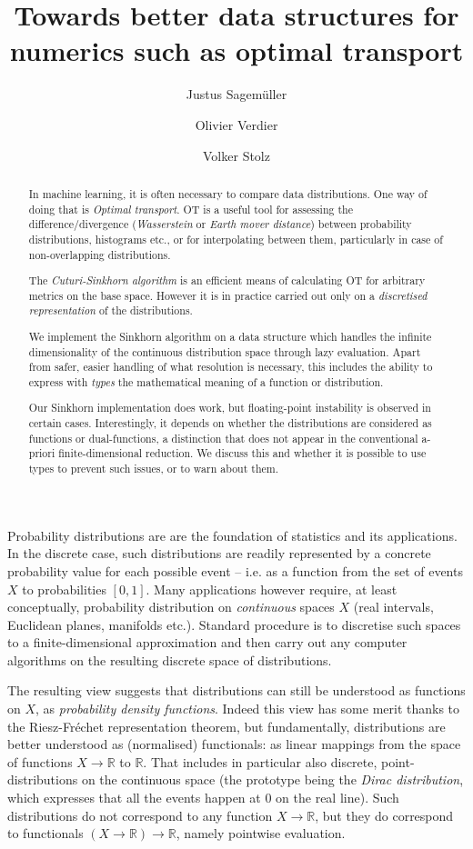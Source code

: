 \documentclass[a4paper]{easychair}
\title{Towards better data structures for numerics such as optimal transport}
\author{
   Justus Sagemüller\inst{1}
\and
    Olivier Verdier\inst{1}
\and
    Volker Stolz\inst{1}
}
\institute{
  Western Norway University of Applied Sciences, 
  Bergen, Norway\\
  \email{\{jsag,over,vsto\}@hvl.no}
 }
\begin{document}
\maketitle

\begin{abstract}
  In machine learning, it is often necessary to compare data distributions. One way of doing that is \emph{Optimal transport}. OT is a useful tool for assessing the difference/divergence (\emph{Wasserstein} or \emph{Earth mover distance}) between probability distributions, histograms etc., or for interpolating between them, particularly in case of non-overlapping distributions.
  
  The \emph{Cuturi-Sinkhorn algorithm} is an efficient means of calculating OT for arbitrary metrics on the base space. However it is in practice carried out only on a \emph{discretised representation} of the distributions.
  
  We implement the Sinkhorn algorithm on a data structure which handles the infinite dimensionality of the continuous distribution space through lazy evaluation. Apart from safer, easier handling of what resolution is necessary, this includes the ability to express with \emph{types} the mathematical meaning of a function or distribution.
  
  Our Sinkhorn implementation does work, but floating-point instability is observed in certain cases. Interestingly, it depends on whether the distributions are considered as functions or dual-functions, a distinction that does not appear in the conventional a-priori finite-dimensional reduction. We discuss this and whether it is possible to use types to prevent such issues, or to warn about them.
\end{abstract}

\label{sec:introduction}
\noindent%
Probability distributions are are the foundation of statistics and its applications. In the discrete case, such distributions are readily represented by a concrete probability value for each possible event -- i.e. as a function from the set of events $X$ to probabilities $[0,1]$.
Many applications however require, at least conceptually, probability distribution on \emph{continuous} spaces $X$ (real intervals, Euclidean planes, manifolds etc.).
Standard procedure is to discretise such spaces to a finite-dimensional approximation and then carry out any computer algorithms on the resulting discrete space of distributions. 

The resulting view suggests that distributions can still be understood as functions on $X$, as \emph{probability density functions}. Indeed this view has some merit thanks to the Riesz-Fréchet representation theorem, but fundamentally, distributions are better understood as (normalised) function{al}s: as linear mappings from the space of functions $X\to\mathbb{R}$ to $\mathbb{R}$.
That includes in particular also discrete, point-distributions on the continuous space (the prototype being the \emph{Dirac distribution}, which expresses that all the events happen at 0 on the real line). Such distributions do not correspond to any function $X\to\mathbb{R}$, but they do correspond to functionals $(X\to\mathbb{R})\to\mathbb{R}$, namely pointwise evaluation.
\end{document}
